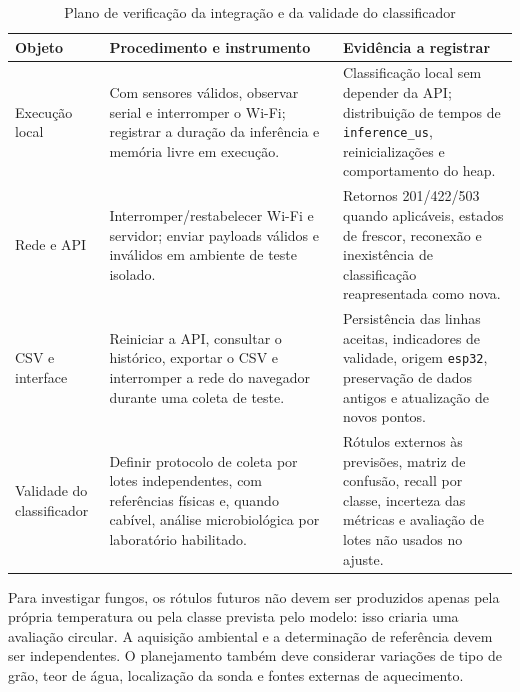\begin{table}[htbp]
\centering\small
\caption{Plano de verificação da integração e da validade do classificador}
\label{tab:testes-integracao}
\begin{tabularx}{\textwidth}{L{2.5cm}Y Y}
\toprule
Objeto & Procedimento e instrumento & Evidência a registrar\\
\midrule
Execução local &
Com sensores válidos, observar serial e interromper o Wi-Fi;
registrar a duração da inferência e memória livre em execução. &
Classificação local sem depender da API; distribuição de tempos
de \texttt{inference\_us}, reinicializações e comportamento do heap.\\
Rede e API &
Interromper/restabelecer Wi-Fi e servidor; enviar payloads válidos
e inválidos em ambiente de teste isolado. &
Retornos 201/422/503 quando aplicáveis, estados de frescor,
reconexão e inexistência de classificação reapresentada como nova.\\
CSV e interface &
Reiniciar a API, consultar o histórico, exportar o CSV e interromper a
rede do navegador durante uma coleta de teste. &
Persistência das linhas aceitas, indicadores de validade, origem
\texttt{esp32}, preservação de dados antigos e atualização de novos pontos.\\
Validade do classificador &
Definir protocolo de coleta por lotes independentes, com referências
físicas e, quando cabível, análise microbiológica por laboratório habilitado. &
Rótulos externos às previsões, matriz de confusão, recall por classe,
incerteza das métricas e avaliação de lotes não usados no ajuste.\\
\bottomrule
\end{tabularx}
\end{table}

Para investigar fungos, os rótulos futuros não devem ser produzidos
apenas pela própria temperatura ou pela classe prevista pelo modelo:
isso criaria uma avaliação circular. A aquisição ambiental e a
determinação de referência devem ser independentes. O planejamento
também deve considerar variações de tipo de grão, teor de água,
localização da sonda e fontes externas de aquecimento.
\FloatBarrier
